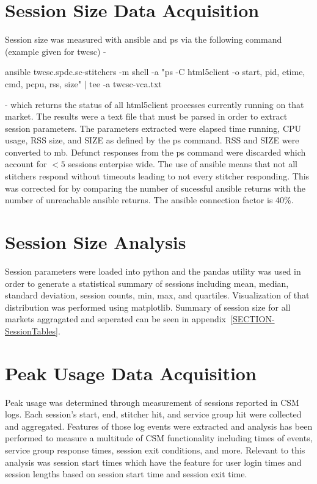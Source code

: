 \documentclass{article}
\begin{document}
\section{Session Size Data Acquisition}

Session size was measured with ansible and ps via the following command (example given for twcsc) - 

\noindent ansible twcsc.spdc.sc-stitchers -m shell -a "ps -C html5client -o start, pid, etime, cmd, pcpu, rss, size" $|$ tee -a twcsc-vca.txt

\noindent - which returns the status of all html5client processes currently running on that market. The results were a text file that must be parsed in order to extract session parameters. The parameters extracted were elapsed time running, CPU usage, RSS size, and SIZE as defined by the ps command. RSS and SIZE were converted to mb. Defunct responses from the ps command were discarded which account for $<5$ sessions enterpise wide. The use of ansible means that not all stitchers respond without timeouts leading to not every stitcher responding. This was corrected for by comparing the number of sucessful ansible returns with the number of unreachable ansible returns. The ansible connection factor is 40\%. 

\section{Session Size Analysis}

Session parameters were loaded into python and the pandas utility was used in order to generate a statistical summary of sessions including mean, median, standard deviation, session counts, min, max, and quartiles. Visualization of that distribution was performed using matplotlib. Summary of session size for all markets aggragated and seperated can be seen in appendix~\ref{SECTION-SessionTables}. 

\section{Peak Usage Data Acquisition}

Peak usage was determined through measurement of sessions reported in CSM logs. Each session's start, end, stitcher hit, and service group hit were collected and aggregated. Features of those log events were extracted and analysis has been performed to measure a multitude of CSM functionality including times of events, service group response times, session exit conditions, and more. Relevant to this analysis was session start times which have the feature for user login times and session lengths based on session start time and session exit time. 
\end{document}
